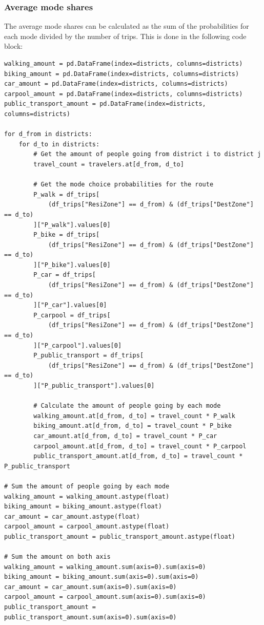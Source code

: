 \documentclass[a4paper,12pt]{article}
\begin{document}
\subsubsection{Average mode shares}
The average mode shares can be calculated as the sum of the probabilities for each mode divided by the number of trips.
This is done in the following code block:
\begin{verbatim}
walking_amount = pd.DataFrame(index=districts, columns=districts)
biking_amount = pd.DataFrame(index=districts, columns=districts)
car_amount = pd.DataFrame(index=districts, columns=districts)
carpool_amount = pd.DataFrame(index=districts, columns=districts)
public_transport_amount = pd.DataFrame(index=districts, columns=districts)

for d_from in districts:
    for d_to in districts:
        # Get the amount of people going from district i to district j
        travel_count = travelers.at[d_from, d_to]

        # Get the mode choice probabilities for the route
        P_walk = df_trips[
            (df_trips["ResiZone"] == d_from) & (df_trips["DestZone"] == d_to)
        ]["P_walk"].values[0]
        P_bike = df_trips[
            (df_trips["ResiZone"] == d_from) & (df_trips["DestZone"] == d_to)
        ]["P_bike"].values[0]
        P_car = df_trips[
            (df_trips["ResiZone"] == d_from) & (df_trips["DestZone"] == d_to)
        ]["P_car"].values[0]
        P_carpool = df_trips[
            (df_trips["ResiZone"] == d_from) & (df_trips["DestZone"] == d_to)
        ]["P_carpool"].values[0]
        P_public_transport = df_trips[
            (df_trips["ResiZone"] == d_from) & (df_trips["DestZone"] == d_to)
        ]["P_public_transport"].values[0]

        # Calculate the amount of people going by each mode
        walking_amount.at[d_from, d_to] = travel_count * P_walk
        biking_amount.at[d_from, d_to] = travel_count * P_bike
        car_amount.at[d_from, d_to] = travel_count * P_car
        carpool_amount.at[d_from, d_to] = travel_count * P_carpool
        public_transport_amount.at[d_from, d_to] = travel_count * P_public_transport

# Sum the amount of people going by each mode
walking_amount = walking_amount.astype(float)
biking_amount = biking_amount.astype(float)
car_amount = car_amount.astype(float)
carpool_amount = carpool_amount.astype(float)
public_transport_amount = public_transport_amount.astype(float)

# Sum the amount on both axis
walking_amount = walking_amount.sum(axis=0).sum(axis=0)
biking_amount = biking_amount.sum(axis=0).sum(axis=0)
car_amount = car_amount.sum(axis=0).sum(axis=0)
carpool_amount = carpool_amount.sum(axis=0).sum(axis=0)
public_transport_amount = public_transport_amount.sum(axis=0).sum(axis=0)
\end{verbatim}
\end{document}
